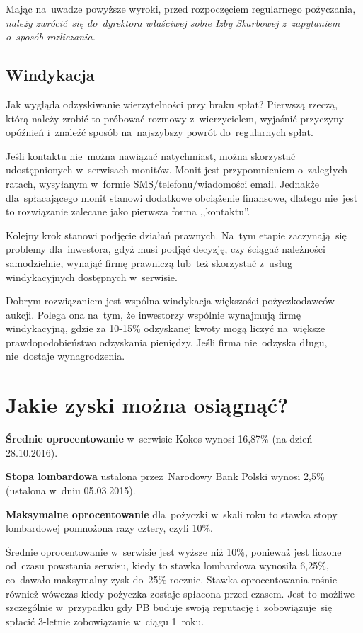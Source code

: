 \documentclass[a4paper,twoside,titlepage,openright]{book}
\begin{document}
Mając na~uwadze powyższe wyroki, przed rozpoczęciem regularnego pożyczania, \emph{należy zwrócić~się do~dyrektora właściwej sobie Izby Skarbowej z~zapytaniem o~sposób rozliczania.} \cite{oswiadczenieKokos}

\subsection*{Windykacja}

Jak wygląda odzyskiwanie wierzytelności przy braku spłat? Pierwszą rzeczą, którą należy zrobić to próbować rozmowy z~wierzycielem, wyjaśnić przyczyny opóźnień i~znaleźć sposób na~najszybszy powrót do~regularnych spłat. 

Jeśli kontaktu nie~można nawiązać natychmiast, można skorzystać udostępnionych w~serwisach monitów. Monit jest przypomnieniem o~zaległych ratach, wysyłanym w~formie SMS/telefonu/wiadomości email. Jednakże dla~spłacającego monit stanowi dodatkowe obciążenie finansowe, dlatego nie~jest to rozwiązanie zalecane jako pierwsza forma ,,kontaktu''. 

Kolejny krok stanowi podjęcie działań prawnych. Na~tym etapie zaczynają~się problemy dla~inwestora, gdyż musi podjąć decyzję, czy ściągać należności samodzielnie, wynająć firmę prawniczą lub~też skorzystać z~usług windykacyjnych dostępnych w~serwisie. 

Dobrym rozwiązaniem jest wspólna windykacja większości pożyczkodawców aukcji. Polega ona na~tym, że inwestorzy wspólnie wynajmują firmę windykacyjną, gdzie za 10-15\% odzyskanej kwoty mogą liczyć na~większe prawdopodobieństwo odzyskania pieniędzy. Jeśli firma nie~odzyska długu, nie~dostaje wynagrodzenia.


\section{Jakie zyski można osiągnąć?}

\textbf{Średnie oprocentowanie} w~serwisie Kokos wynosi 16,87\% \cite{zostanInwestorem} (na dzień 28.10.2016).

\textbf{Stopa lombardowa} ustalona przez~Narodowy Bank Polski wynosi 2,5\% \cite{stopy} (ustalona w~dniu 05.03.2015).
 
\textbf{Maksymalne oprocentowanie} dla~pożyczki w~skali roku to stawka stopy lombardowej pomnożona razy cztery, czyli 10\%.

Średnie oprocentowanie w~serwisie jest wyższe niż 10\%, ponieważ jest liczone od~czasu powstania serwisu, kiedy to stawka lombardowa wynosiła 6,25\%, co~dawało maksymalny zysk do~25\% rocznie. Stawka oprocentowania rośnie również wówczas kiedy pożyczka zostaje spłacona przed czasem. Jest to możliwe szczególnie w~przypadku gdy PB buduje swoją reputację i~zobowiązuje~się spłacić \mbox{3-letnie} zobowiązanie w~ciągu 1~roku. 
\end{document}
